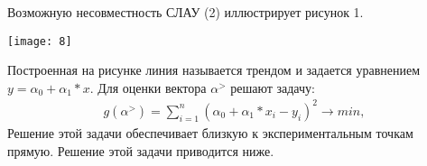 \documentclass[__main__.tex]{subfiles}
\begin{document}
Возможную несовместность СЛАУ (2) иллюстрирует рисунок 1.

\begin{minipage}{.35\linewidth}
	\texttt{[image: 8]}
\end{minipage}
\hfill
\begin{minipage}{.6\linewidth}
	Построенная на рисунке линия называется трендом и задается уравнением $y = \alpha_0 + \alpha_1 * x$. Для оценки вектора $\alpha^{>}$ решают задачу:
	\begin{gather}
		\label{2}
		g(\alpha^{>}) = \sum_{i=1}^{n}(\alpha_0 + \alpha_1 * x_i - y_i)^2 \rightarrow min, 
	\end{gather}
Решение этой задачи обеспечивает близкую к экспериментальным точкам прямую. Решение этой задачи приводится ниже.
\end{minipage}\\
\end{document}
